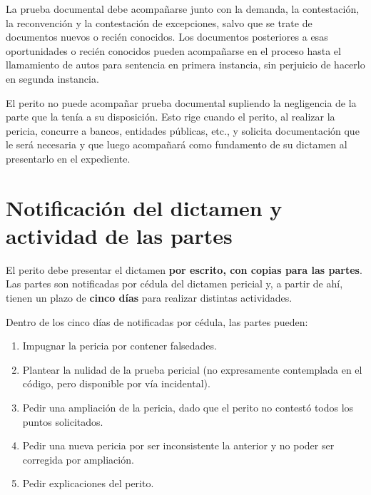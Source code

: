 \documentclass[12pt,oneside]{book}
\begin{document}
La prueba documental debe acompañarse junto con la demanda, la contestación, la reconvención y la contestación de excepciones, salvo que se trate de documentos nuevos o recién conocidos. Los documentos posteriores a esas oportunidades o recién conocidos pueden acompañarse en el proceso hasta el llamamiento de autos para sentencia en primera instancia, sin perjuicio de hacerlo en segunda instancia.


\begin{important}
El perito no puede acompañar prueba documental supliendo la negligencia de la parte que la tenía a su disposición. Esto rige cuando el perito, al realizar la pericia, concurre a bancos, entidades públicas, etc., y solicita documentación que le será necesaria y que luego acompañará como fundamento de su dictamen al presentarlo en el expediente.
\end{important}

\section{Notificación del dictamen y actividad de las partes}

El perito debe presentar el dictamen \textbf{por escrito, con copias para las partes}. Las partes son notificadas por cédula del dictamen pericial y, a partir de ahí, tienen un plazo de \textbf{cinco días} para realizar distintas actividades.

Dentro de los cinco días de notificadas por cédula, las partes pueden:

\begin{enumerate}[label=\alph*)]
    \item Impugnar la pericia por contener falsedades.
    \item Plantear la nulidad de la prueba pericial (no expresamente contemplada en el código, pero disponible por vía incidental).
    \item Pedir una ampliación de la pericia, dado que el perito no contestó todos los puntos solicitados.
    \item Pedir una nueva pericia por ser inconsistente la anterior y no poder ser corregida por ampliación.
    \item Pedir explicaciones del perito.
\end{enumerate}
\end{document}
